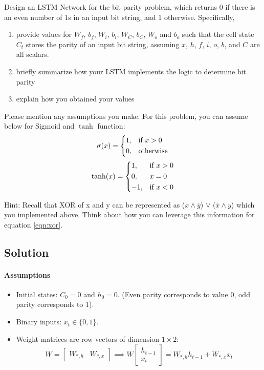 \documentclass[11pt,english]{article}
\begin{document}
\begin{enumerate}[resume]
Design an LSTM Network for the bit parity problem, which returns $0$ if there is an even number of $1$s in an input bit string, and $1$ otherwise. 
Specifically, 
\begin{enumerate}
    \item provide values for $W_f$, $b_f$, $W_i$, $b_i$, $W_C$, $b_C$, $W_o$ and $b_o$ such that the cell state $C_t$ stores the parity of an input bit string, assuming $x$, $h$, $f$, $i$, $o$, $b$, and $C$ are all scalars.
    \item briefly summarize how your LSTM implements the logic to determine bit parity  
    \item explain how you obtained your values
\end{enumerate}
Please mention any assumptions you make. For this problem, you can assume below for Sigmoid and $\tanh$ function: \\

\begin{equation}
    \sigma(x) = \begin{dcases}
    1,& \text{if } x > 0\\
    0,              & \text{otherwise}
\end{dcases}
\end{equation}
\begin{equation}
    \tanh(x) = \begin{dcases}
    1,& \text{if } x > 0\\
    0,              & x = 0\\
    -1,& \text{if } x < 0
\end{dcases}
\end{equation}


Hint: Recall that XOR of x and y can be represented as ($x\land \bar{y}$) $\lor$ ($\bar{x} \land y$) which you implemented above. Think about how you can leverage this information for equation \eqref{eqn:xor}.

\subsection*{Solution}

\paragraph*{Assumptions}
\begin{itemize}
    \item Initial states: $C_0 = 0$ and $h_0 = 0$. (Even parity corresponds to value $0$, odd parity corresponds to $1$).
    \item Binary inputs: $x_t \in \{0, 1\}$.
    \item Weight matrices are row vectors of dimension $1 \times 2$:
    \[
    W = \begin{bmatrix} W_{*, h} & W_{*, x} \end{bmatrix} \implies W \begin{bmatrix} h_{t-1} \\ x_t \end{bmatrix} = W_{*, h} h_{t-1} + W_{*, x} x_t
    \]
\end{itemize}


\end{enumerate}
\end{document}
